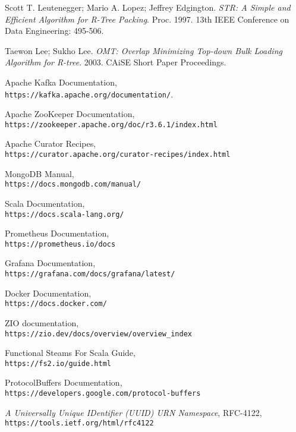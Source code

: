 \documentclass[14pt]{article}
\begin{document}
\begin{thebibliography}{9}
Scott T. Leutenegger; Mario A. Lopez; Jeffrey Edgington. \textit{STR: A Simple and Efficient Algorithm for R-Tree Packing}. Proc. 1997. 13th IEEE Conference on Data Engineering: 495-506.

Taewon Lee; Sukho Lee. \textit{OMT: Overlap Minimizing Top-down Bulk Loading Algorithm for R-tree}. 2003. CAiSE Short Paper Proceedings.

Apache Kafka Documentation,\\
\texttt{https://kafka.apache.org/documentation/}.

Apache ZooKeeper Documentation,\\
\texttt{https://zookeeper.apache.org/doc/r3.6.1/index.html}

Apache Curator Recipes,\\
\texttt{https://curator.apache.org/curator-recipes/index.html}

MongoDB Manual,\\
\texttt{https://docs.mongodb.com/manual/}

Scala Documentation,\\
\texttt{https://docs.scala-lang.org/}

Prometheus Documentation,\\
\texttt{https://prometheus.io/docs}

Grafana Documentation,\\
\texttt{https://grafana.com/docs/grafana/latest/}

Docker Documentation,\\
\texttt{https://docs.docker.com/}

ZIO documentation,\\
\texttt{https://zio.dev/docs/overview/overview\_index}

Functional Steams For Scala Guide,\\
\texttt{https://fs2.io/guide.html}

ProtocolBuffers Documentation,\\
\texttt{https://developers.google.com/protocol-buffers}

\textit{A Universally Unique IDentifier (UUID) URN Namespace},
RFC-4122,\\
\texttt{https://tools.ietf.org/html/rfc4122}

\end{thebibliography}
\end{document}
